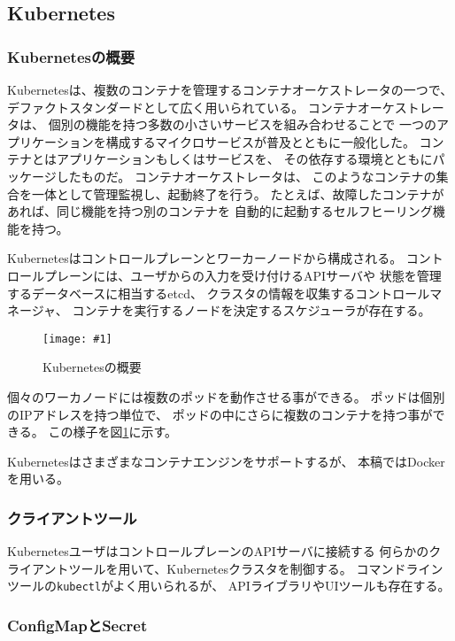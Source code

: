 \documentclass[submit,techrep]{ipsj}
\newcommand{\reffig}[1]{図\ref{#1}}
\newcommand{\epsfig}[4]{
\begin{figure}[tb]
  \begin{center}
    \texttt{[image: \#1]}
  \end{center}
  \caption{#3}
  \label{#4}
\end{figure}}
\newcommand{\kbs}{Kubernetes}
\begin{document}
\subsection{\kbs}
\subsubsection{\kbs の概要}
\kbs\cite{k8s}は、複数のコンテナを管理するコンテナオーケストレータの一つで、
デファクトスタンダードとして広く用いられている。
コンテナオーケストレータは、
個別の機能を持つ多数の小さいサービスを組み合わせることで
一つのアプリケーションを構成するマイクロサービスが普及とともに一般化した。
コンテナとはアプリケーションもしくはサービスを、
その依存する環境とともにパッケージしたものだ。
コンテナオーケストレータは、
このようなコンテナの集合を一体として管理監視し、起動終了を行う。
たとえば、故障したコンテナがあれば、同じ機能を持つ別のコンテナを
自動的に起動するセルフヒーリング機能を持つ。

\kbs はコントロールプレーンとワーカーノードから構成される。
コントロールプレーンには、ユーザからの入力を受け付けるAPIサーバや
状態を管理するデータベースに相当するetcd、
クラスタの情報を収集するコントロールマネージャ、
コンテナを実行するノードを決定するスケジューラが存在する。

\epsfig{figs/kubernetes.pdf}{width=8.5cm}{\kbs の概要}{kubernetes}

個々のワーカノードには複数のポッドを動作させる事ができる。
ポッドは個別のIPアドレスを持つ単位で、
ポッドの中にさらに複数のコンテナを持つ事ができる。
この様子を\reffig{kubernetes}に示す。

\kbs はさまざまなコンテナエンジンをサポートするが、
本稿ではDockerを用いる。

\subsubsection{クライアントツール}
\kbs ユーザはコントロールプレーンのAPIサーバに接続する
何らかのクライアントツールを用いて、\kbs クラスタを制御する。
コマンドラインツールの\verb|kubectl|がよく用いられるが、
APIライブラリやUIツールも存在する。




\subsubsection{ConfigMapとSecret}
\end{document}
